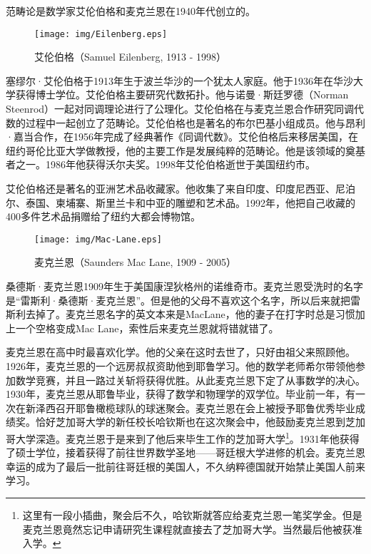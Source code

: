 \documentclass{article}
\begin{document}
范畴论是数学家艾伦伯格和麦克兰恩在1940年代创立的。

\begin{wrapfigure}{R}{0.3\textwidth}
 \centering
 \texttt{[image: img/Eilenberg.eps]}
 \captionsetup{labelformat=empty}
 \caption{艾伦伯格（Samuel Eilenberg, 1913 - 1998）}
 \label{fig:Eilenberg}
\end{wrapfigure}

塞缪尔·艾伦伯格于1913年生于波兰华沙的一个犹太人家庭。他于1936年在华沙大学获得博士学位。艾伦伯格主要研究代数拓扑。他与诺曼·斯廷罗德（Norman Steenrod）一起对同调理论进行了公理化。艾伦伯格在与麦克兰恩合作研究同调代数的过程中一起创立了范畴论。艾伦伯格也是著名的布尔巴基小组成员。他与昂利·嘉当合作，在1956年完成了经典著作《同调代数》。艾伦伯格后来移居美国，在纽约哥伦比亚大学做教授，他的主要工作是发展纯粹的范畴论。他是该领域的奠基者之一。1986年他获得沃尔夫奖。1998年艾伦伯格逝世于美国纽约市。

艾伦伯格还是著名的亚洲艺术品收藏家。他收集了来自印度、印度尼西亚、尼泊尔、泰国、柬埔寨、斯里兰卡和中亚的雕塑和艺术品。1992年，他把自己收藏的400多件艺术品捐赠给了纽约大都会博物馆\cite{Wiki-Eilenberg}。

\begin{wrapfigure}{L}{0.3\textwidth}
 \centering
 \texttt{[image: img/Mac-Lane.eps]}
 \captionsetup{labelformat=empty}
 \caption{麦克兰恩（Saunders Mac Lane, 1909 - 2005）}
 \label{fig:Mac-Lane}
\end{wrapfigure}

桑德斯·麦克兰恩1909年生于美国康涅狄格州的诺维奇市。麦克兰恩受洗时的名字是“雷斯利·桑德斯·麦克兰恩”。但是他的父母不喜欢这个名字，所以后来就把雷斯利去掉了。麦克兰恩名字的英文本来是MacLane，他的妻子在打字时总是习惯加上一个空格变成Mac Lane，索性后来麦克兰恩就将错就错了。

麦克兰恩在高中时最喜欢化学。他的父亲在这时去世了，只好由祖父来照顾他。1926年，麦克兰恩的一个远房叔叔资助他到耶鲁学习。他的数学老师希尔带领他参加数学竞赛，并且一路过关斩将获得优胜。从此麦克兰恩下定了从事数学的决心。1930年，麦克兰恩从耶鲁毕业，获得了数学和物理学的双学位。毕业前一年，有一次在新泽西召开耶鲁橄榄球队的球迷聚会。麦克兰恩在会上被授予耶鲁优秀毕业成绩奖\cite{Wiki-Mac-Lane}。恰好芝加哥大学的新任校长哈钦斯也在这次聚会中，他鼓励麦克兰恩到芝加哥大学深造。麦克兰恩于是来到了他后来毕生工作的芝加哥大学\footnote{这里有一段小插曲，聚会后不久，哈钦斯就答应给麦克兰恩一笔奖学金。但是麦克兰恩竟然忘记申请研究生课程就直接去了芝加哥大学。当然最后他被获准入学。}。1931年他获得了硕士学位，接着获得了前往世界数学圣地——哥廷根大学进修的机会。麦克兰恩幸运的成为了最后一批前往哥廷根的美国人，不久纳粹德国就开始禁止美国人前来学习。
\end{document}
